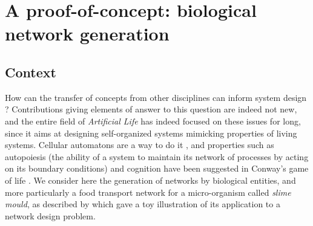 \documentclass[runningheads,a4paper]{llncs}
\begin{document}

%















\section{A proof-of-concept: biological network generation}


\subsection{Context}


How can the transfer of concepts from other disciplines can inform system design ? Contributions giving elements of answer to this question are indeed not new, and the entire field of \emph{Artificial Life} \cite{langton1989artificial} has indeed focused on these issues for long, since it aims at designing self-organized systems mimicking properties of living systems. Cellular automatons are a way to do it \cite{langton1986studying}, and properties such as autopoiesis (the ability of a system to maintain its network of processes by acting on its boundary conditions) and cognition have been suggested in Conway's game of life \cite{beer2004autopoiesis}. We consider here the generation of networks by biological entities, and more particularly a food transport network for a micro-organism called \emph{slime mould}, as described by \cite{tero2010rules} which gave a toy illustration of its application to a network design problem.
\end{document}
